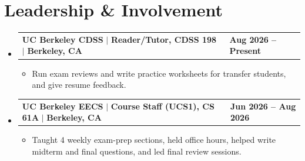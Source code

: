 \documentclass[letterpaper,11pt]{article}
\makeatletter
\newcommand{\resumeItem}[1]{%
  \item\small{{#1\vspace{-2pt}}}%
}
\newcommand{\resumeLeadHeading}[4]{
  \vspace{-1pt}\item
    \begin{tabularx}{1.0\textwidth}[t]{@{}X@{}>{\raggedright\arraybackslash}p{1.5in}@{}}
      \textbf{#1} $|$ \textbf{#2} $|$ \textbf{\small #3} & \textbf{\small #4} \\
    \end{tabularx}\vspace{-5pt}
}
\newcommand{\resumeSubHeadingListStart}{\begin{itemize}[leftmargin=0.0in, label={}]}
\newcommand{\resumeSubHeadingListEnd}{\end{itemize}}
\newcommand{\resumeItemListStart}{\begin{itemize}[itemsep=2.5pt, topsep=3pt]}
\newcommand{\resumeItemListEnd}{\end{itemize}\vspace{-4pt}}
\makeatother
\begin{document}
\section{Leadership \& Involvement}
    \resumeSubHeadingListStart

        \resumeLeadHeading
            {UC Berkeley CDSS}{Reader/Tutor, CDSS 198}{Berkeley, CA}{Aug 2026 -- Present}
        \resumeItemListStart
            \resumeItem{Run exam reviews and write practice worksheets for transfer students, and give resume feedback.}
        \resumeItemListEnd

        \resumeLeadHeading
            {UC Berkeley EECS}{Course Staff (UCS1), CS 61A}{Berkeley, CA}{Jun 2026 -- Aug 2026}
        \resumeItemListStart
            \resumeItem{Taught 4 weekly exam-prep sections, held office hours, helped write midterm and final questions, and led final review sessions.}
        \resumeItemListEnd

    \resumeSubHeadingListEnd
\vspace{-6pt}
\end{document}
